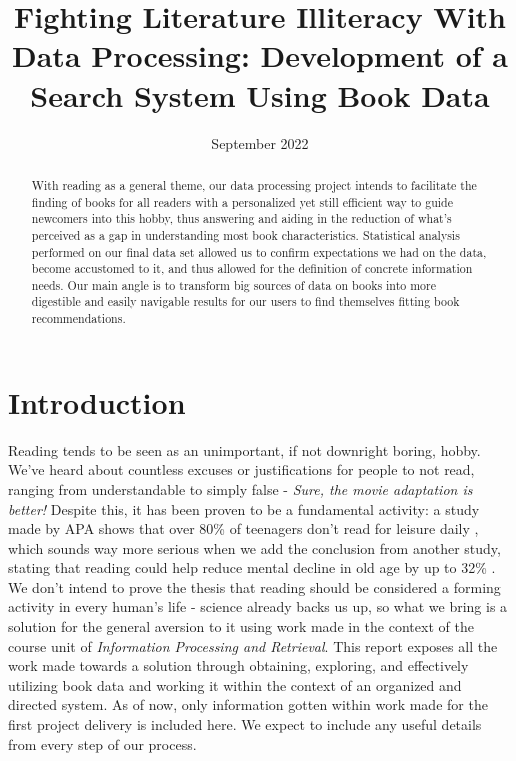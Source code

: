 \documentclass[conference]{IEEEtran}
\title{Fighting Literature Illiteracy With Data Processing: Development of a Search System Using Book Data}
\author{
\IEEEauthorblockN{Frederico Rodrigues\IEEEauthorrefmark{1}, Mateus Silva\IEEEauthorrefmark{2} and Melissa Silva \IEEEauthorrefmark{3}}
\vspace{0.05in}
\IEEEauthorblockA{\IEEEauthorrefmark{1}FEUP. \emph{up201807626@up.pt}}
\IEEEauthorblockA{\IEEEauthorrefmark{2}FEUP. \emph{up201906232@up.pt}}
\IEEEauthorblockA{\IEEEauthorrefmark{3}FEUP. \emph{up201905076@up.pt}}
}
\date{September 2022}
\begin{document}
\maketitle

\begin{abstract}
With reading as a general theme, our data processing project intends to facilitate the finding of books for all readers with a personalized yet still efficient way to guide newcomers into this hobby, thus answering and aiding in the reduction of what's perceived as a gap in understanding most book characteristics. Statistical analysis performed on our final data set allowed us to confirm expectations we had on the data, become accustomed to it, and thus allowed for the definition of concrete information needs. Our main angle is to transform big sources of data on books into more digestible and easily navigable results for our users to find themselves fitting book recommendations.
\end{abstract}

\section{Introduction}
Reading tends to be seen as an unimportant, if not downright boring, hobby. We've heard about countless excuses or justifications for people to not read, ranging from understandable to simply false - \textit{Sure, the movie adaptation is better!} \newline
Despite this, it has been proven to be a fundamental activity: a study made by APA shows that over 80\% of teenagers don't read for leisure daily \cite{twenge2019trends}, which sounds way more serious when we add the conclusion from another study, stating that reading could help reduce mental decline in old age by up to 32\% \cite{Wilson314}. \newline
We don't intend to prove the thesis that reading should be considered a forming activity in every human's life - science already backs us up, so what we bring is a solution for the general aversion to it using work made in the context of the course unit of \textit{Information Processing and Retrieval}. \newline
This report exposes all the work made towards a solution through obtaining, exploring, and effectively utilizing book data and working it within the context of an organized and directed system. \newline
As of now, only information gotten within work made for the first project delivery is included here. We expect to include any useful details from every step of our process.
\end{document}
